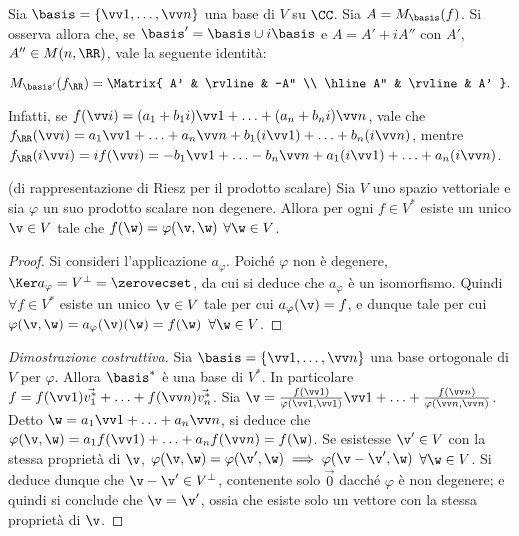 \documentclass[11pt]{article}
\begin{document}
	\begin{remark}
		Sia $\basis = \{\vv 1, \ldots, \vv n\}$ una base di $V$ su $\CC$. Sia $A = M_\basis(f)$. Si
		osserva allora che, se $\basis' = \basis \cup i \basis$ e $A = A' + i A''$ con $A'$, $A'' \in M(n, \RR)$,
		vale la seguente identità:
		
		\[ M_{\basis'}(f_\RR) = \Matrix{ A' & \rvline & -A'' \\ \hline A'' & \rvline & A' }. \]
		
		Infatti, se $f(\vv i) = (a_1 + b_1 i) \vv 1 + \ldots + (a_n + b_n i) \vv n$, vale che
		$f_\RR(\vv i) = a_1 \vv 1 + \ldots + a_n \vv n + b_1 (i \vv 1) + \ldots + b_n (i \vv n)$,
		mentre $f_\RR(i \vv i) = i f(\vv i) = - b_1 \vv 1 + \ldots - b_n \vv n + a_1 (i \vv 1) + \ldots + a_n (i \vv n)$.
	\end{remark}

	
	\hr	
	
	\begin{theorem} (di rappresentazione di Riesz per il prodotto scalare) 
		Sia $V$ uno spazio vettoriale e sia $\varphi$ un suo prodotto scalare
		non degenere. Allora per ogni $f \in V^*$ esiste un unico $\v \in V$ tale che
		$f(\w) = \varphi(\v, \w)$ $\forall \w \in V$.
	\end{theorem}

	\begin{proof}
		Si consideri l'applicazione $a_\varphi$. Poiché $\varphi$ non è degenere, $\Ker a_\varphi = V^\perp = \zerovecset$, da cui si deduce che $a_\varphi$ è un isomorfismo. Quindi $\forall f \in V^*$ esiste
		un unico $\v \in V$ tale per cui $a_\varphi(\v) = f$, e dunque tale per cui $\varphi(\v, \w) = a_\varphi(\v)(\w) = f(\w)$ $\forall \w \in V$.
	\end{proof}
	
	\begin{proof}[Dimostrazione costruttiva]
		Sia $\basis = \{ \vv 1, \ldots, \vv n \}$ una base ortogonale di $V$ per $\varphi$. Allora $\basis^*$ è una base di $V^*$. In
		particolare $f = f(\vv 1) \vec{v_1^*} + \ldots + f(\vv n) \vec{v_n^*}$. Sia $\v = \frac{f(\vv 1)}{\varphi(\vv 1, \vv 1)} \vv 1 + \ldots + \frac{f(\vv n)}{\varphi(\vv n, \vv n)}$. Detto $\w = a_1 \vv 1 + \ldots + a_n \vv n$,
		si deduce che $\varphi(\v, \w) = a_1 f(\vv 1) + \ldots + a_n f(\vv n) = f(\w)$. Se esistesse $\v' \in V$ con
		la stessa proprietà di $\v$, $\varphi(\v, \w) = \varphi(\v', \w) \implies \varphi(\v - \v', \w)$ $\forall \w \in V$. Si deduce dunque che $\v - \v' \in V^\perp$, contenente solo $\vec 0$ dacché $\varphi$ è non degenere;
		e quindi si conclude che $\v = \v'$, ossia che esiste solo un vettore con la stessa proprietà di $\v$.
	\end{proof}
\end{document}
